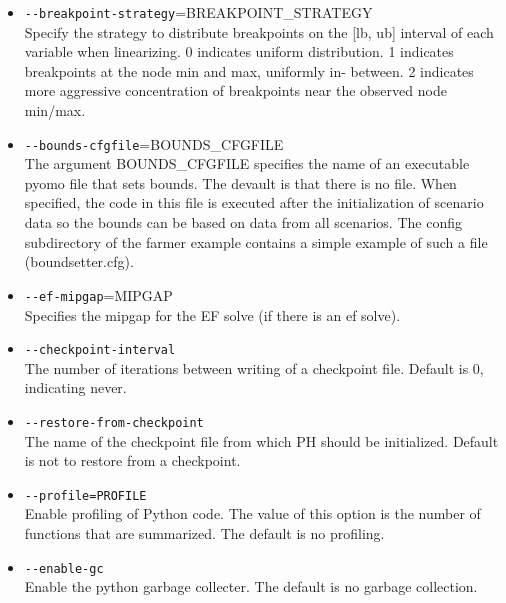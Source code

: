 \begin{itemize}
  \item \verb|--breakpoint-strategy|=BREAKPOINT\_STRATEGY                    \\
  Specify the strategy to distribute breakpoints on the [lb, ub] interval of
  each variable when linearizing. 0 indicates uniform distribution. 1 indicates
  breakpoints at the node min and max, uniformly in- between. 2 indicates more
  aggressive concentration of breakpoints near the observed node min/max.

  \item \verb|--bounds-cfgfile|=BOUNDS\_CFGFILE                              \\
  The argument BOUNDS\_CFGFILE specifies the name of an executable pyomo file
  that sets bounds. The devault is that there is no file. When specified, the
  code in this file is executed after the initialization of scenario data so the
  bounds can be based on data from all scenarios. The config subdirectory of the
  farmer example contains a simple example of such a file (boundsetter.cfg).

  \item \verb|--ef-mipgap|=MIPGAP \\
     Specifies the mipgap for the EF solve (if there is an ef solve).

  \item \verb|--checkpoint-interval|                                         \\
  The number of iterations between writing of a checkpoint file. Default is 0,
  indicating never.

  \item \verb|--restore-from-checkpoint|                                     \\
  The name of the checkpoint file from which PH should be initialized. Default
  is not to restore from a checkpoint.

  \item \verb|--profile=PROFILE|                                             \\
  Enable profiling of Python code. The value of this option is the number of
  functions that are summarized. The default is no profiling.

  \item \verb|--enable-gc|                                                   \\
  Enable the python garbage collecter. The default is no garbage collection.
\end{itemize}

